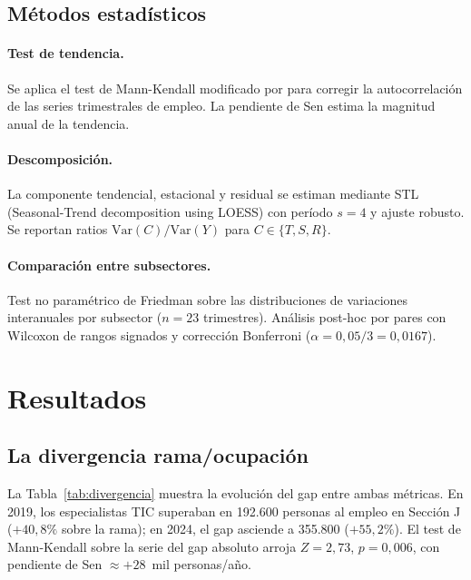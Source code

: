 \documentclass[11pt,a4paper]{article}
\begin{document}
\subsection{Métodos estadísticos}

\paragraph{Test de tendencia.} Se aplica el test de Mann-Kendall modificado por
\citet{hamed1998} para corregir la autocorrelación de las series trimestrales
de empleo. La pendiente de Sen estima la magnitud anual de la tendencia.

\paragraph{Descomposición.} La componente tendencial, estacional y residual se
estiman mediante STL (Seasonal-Trend decomposition using LOESS) con período
$s = 4$ y ajuste robusto. Se reportan ratios $\text{Var}(C)/\text{Var}(Y)$ para
$C \in \{T, S, R\}$.

\paragraph{Comparación entre subsectores.} Test no paramétrico de Friedman
sobre las distribuciones de variaciones interanuales por subsector ($n=23$
trimestres). Análisis post-hoc por pares con Wilcoxon de rangos signados y
corrección Bonferroni ($\alpha = 0{,}05/3 = 0{,}0167$).

\section{Resultados}

\subsection{La divergencia rama/ocupación}

La Tabla~\ref{tab:divergencia} muestra la evolución del gap entre ambas
métricas. En 2019, los especialistas TIC superaban en 192.600 personas al
empleo en Sección J ($+40{,}8\%$ sobre la rama); en 2024, el gap asciende a
355.800 ($+55{,}2\%$). El test de Mann-Kendall sobre la serie del gap absoluto
arroja $Z=2{,}73$, $p=0{,}006$, con pendiente de Sen $\approx +28$~mil
personas/año.
\end{document}
